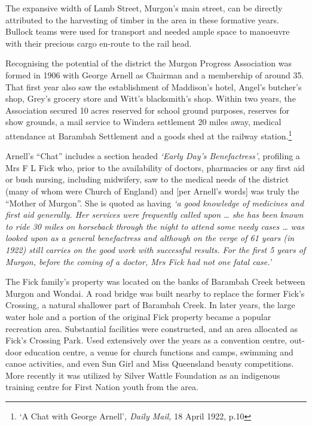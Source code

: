 \smallskip


The expansive width of Lamb Street, Murgon's main street, can be directly attributed to the harvesting of timber in the area in these formative years. Bullock teams were used for transport and needed ample space to manoeuvre with their precious cargo en-route to the rail head.



Recognising the potential of the district the Murgon Progress Association was formed in 1906 with George Arnell as Chairman and a membership of around 35. That first year also saw the establishment of Maddison's hotel, Angel's butcher's shop, Grey's grocery store and Witt's blacksmith's shop. Within two years, the Association secured 10 acres reserved for school ground purposes, reserves for show grounds, a mail service to Windera settlement 20 miles away, medical attendance at Barambah Settlement and a goods shed at the railway station.\footnote{`A Chat with George Arnell'\emph{, Daily Mail,} 18 April 1922, p.10}


Arnell's ``Chat'' includes a section headed \emph{`Early Day's Benefactress'}, profiling a Mrs F L Fick who, prior to the availability of doctors, pharmacies or any first aid or bush nursing, including midwifery, saw to the medical needs of the district (many of whom were Church of England) and {[}per Arnell's words{]} was truly the ``Mother of Murgon''. She is quoted as having \emph{`a good knowledge of medicines and first aid generally. Her services were frequently called upon \ldots{} she has been known to ride 30 miles on horseback through the night to attend some needy cases \ldots{} was looked upon as a general benefactress and although on the verge of 61 years (in 1922) still carries on the good work with successful results. For the first 5 years of Murgon, before the coming of a doctor, Mrs Fick had not one fatal case.'}



The Fick family's property was located on the banks of Barambah Creek between Murgon and Wondai. A road bridge was built nearby to replace the former Fick's Crossing\emph{,} a natural shallower part of Barambah Creek. In later years, the large water hole and a portion of the original Fick property became a popular recreation area. Substantial facilities were constructed, and an area allocated as Fick's Crossing Park\emph{.} Used extensively over the years as a convention centre, out-door education centre, a venue for church functions and camps, swimming and canoe activities, and even Sun Girl and Miss Queensland beauty competitions. More recently it was utilized by Silver Wattle Foundation as an indigenous training centre for First Nation youth from the area.



